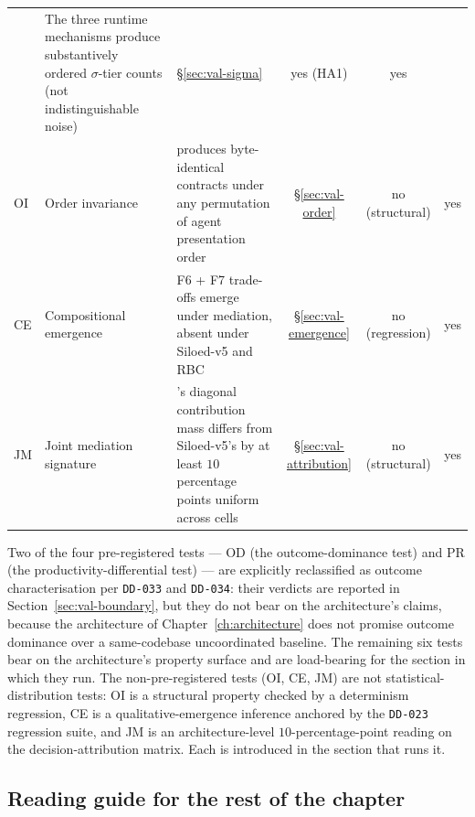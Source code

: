 \begin{table}[ht]
\begin{tabularx}{\textwidth}{@{}l l X c c c@{}}
     & The three runtime mechanisms produce substantively ordered
       $\sigma$-tier counts (not indistinguishable noise)
     & \S\ref{sec:val-sigma}
     & yes (HA1)
     & yes \\
OI   & Order invariance
     & \NEXUS{} produces byte-identical contracts under any
       permutation of agent presentation order
     & \S\ref{sec:val-order}
     & no (structural)
     & yes \\
CE   & Compositional emergence
     & F6 + F7 trade-offs emerge under \NEXUS{} mediation, absent
       under Siloed-v5 and RBC
     & \S\ref{sec:val-emergence}
     & no (regression)
     & yes \\
JM   & Joint mediation signature
     & \NEXUS{}'s diagonal contribution mass differs from Siloed-v5's
       by at least $10$ percentage points uniform across cells
     & \S\ref{sec:val-attribution}
     & no (structural)
     & yes \\
\bottomrule
\end{tabularx}
\end{table}

Two of the four pre-registered tests --- OD (the outcome-dominance
test) and PR (the productivity-differential test) --- are explicitly
reclassified as outcome characterisation per \texttt{DD-033} and
\texttt{DD-034}: their verdicts are reported in
Section~\ref{sec:val-boundary}, but they do not bear on the
architecture's claims, because the architecture of
Chapter~\ref{ch:architecture} does not promise outcome dominance over
a same-codebase uncoordinated baseline. The remaining six tests bear
on the architecture's property surface and are load-bearing for the
section in which they run. The non-pre-registered tests (OI, CE, JM)
are not statistical-distribution tests: OI is a structural property
checked by a determinism regression, CE is a qualitative-emergence
inference anchored by the \texttt{DD-023} regression suite, and JM
is an architecture-level $10$-percentage-point reading on the
decision-attribution matrix. Each is introduced in the section that
runs it.

\subsection{Reading guide for the rest of the chapter}
\label{subsec:val-roadmap}

